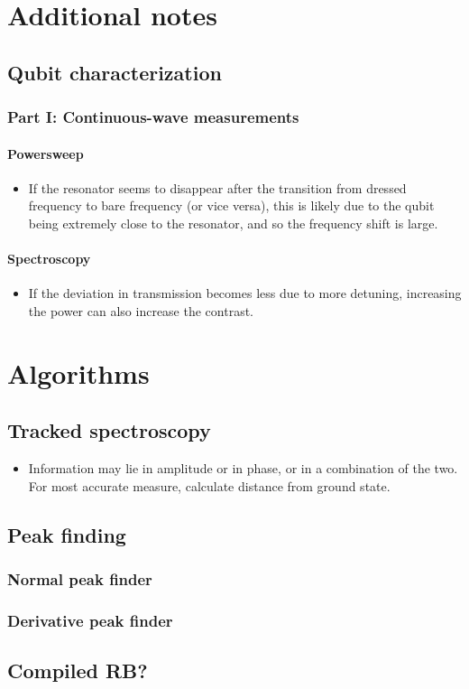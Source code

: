 \documentclass[12pt]{report}
\begin{document}
\begin{appendices}

  \chapter{Additional notes}
    \section{Qubit characterization}
      \subsection{Part I: Continuous-wave measurements}
        \subsubsection{Powersweep}
          \begin{itemize}
            \item If the resonator seems to disappear after the transition from dressed frequency to bare frequency (or vice versa), this is likely due to the qubit being extremely close to the resonator, and so the frequency shift is large.
          \end{itemize}
        \subsubsection{Spectroscopy}
          \begin{itemize}
            \item If the deviation in transmission becomes less due to more detuning, increasing the power can also increase the contrast.
          \end{itemize}
  \chapter{Algorithms}
    \section{Tracked spectroscopy}
    \label{sec:app-Tracked spectroscopy}
      \begin{itemize}
        \item Information may lie in amplitude or in phase, or in a combination of the two. For most accurate measure, calculate distance from ground state.
      \end{itemize}
    \section{Peak finding}
      \subsection{Normal peak finder}
      \subsection{Derivative peak finder}
    \section{Compiled RB?}

\end{appendices}



\end{document}
